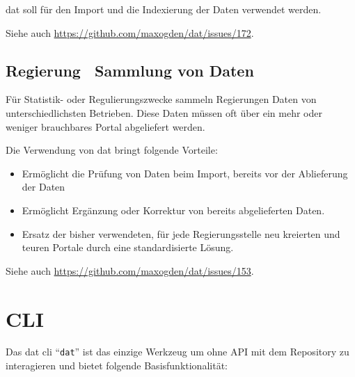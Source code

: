 dat soll für den Import und die Indexierung der Daten verwendet werden.

Siehe auch \url{https://github.com/maxogden/dat/issues/172}.

\subsection{Regierung \textendash\ Sammlung von Daten} %
Für Statistik- oder Regulierungszwecke sammeln Regierungen Daten von unterschiedlichsten Betrieben. Diese Daten müssen oft über ein mehr oder weniger brauchbares Portal abgeliefert werden.

Die Verwendung von dat bringt folgende Vorteile:
\begin{itemize}
\item Ermöglicht die Prüfung von Daten beim Import, bereits vor der Ablieferung der Daten
\item Ermöglicht Ergänzung oder Korrektur von bereits abgelieferten Daten.
\item Ersatz der bisher verwendeten, für jede Regierungsstelle neu kreierten und teuren Portale durch eine standardisierte Lösung.
\end{itemize}

Siehe auch \url{https://github.com/maxogden/dat/issues/153}.

\section{CLI}


Das \gls{dat} \gls{cli} ``\texttt{dat}'' ist das einzige Werkzeug um ohne API mit dem Repository zu interagieren und bietet folgende Basisfunktionalität:


